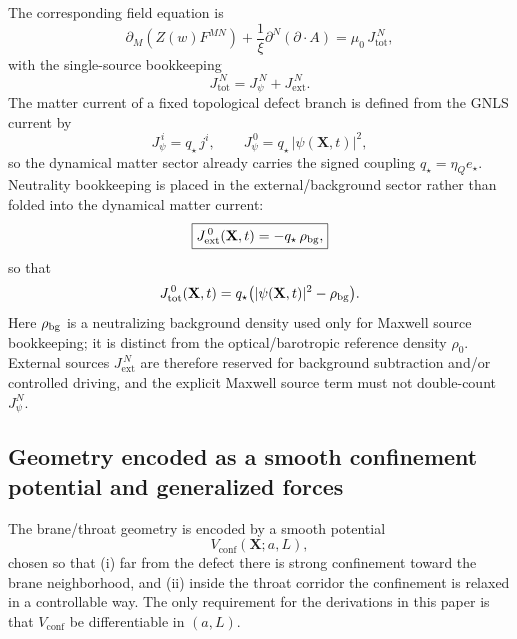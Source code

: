 \documentclass[11pt]{article}
\newcommand{\etaQ}{\eta_Q}
\newcommand{\estar}{e_\star}
\newcommand{\qstar}{q_\star}
\begin{document}
The corresponding field equation is
\begin{equation}
\boxed{
\partial_M\!\left(Z(w)F^{MN}\right)+\frac{1}{\xi}\partial^N(\partial\cdot A)
=
\mu_0\,J_{\mathrm{tot}}^{\,N},
}
\label{eq:recap_maxwell_localized}
\end{equation}
with the single-source bookkeeping
\begin{equation}
J_{\mathrm{tot}}^{\,N}=J_{\psi}^{\,N}+J_{\mathrm{ext}}^{\,N}.
\end{equation}
The matter current of a fixed topological defect branch is defined from the GNLS current by
\begin{equation}
J_{\psi}^{\,i} = \qstar\,j^i,
\qquad
J_{\psi}^{\,0} = \qstar\,|\psi(\mathbf{X},t)|^2,
\end{equation}
so the dynamical matter sector already carries the signed coupling \(\qstar=\etaQ\estar\). Neutrality bookkeeping is placed in the external/background sector rather than folded into the dynamical matter current:
\begin{equation}
\boxed{
J_{\mathrm{ext}}^{\,0}(\mathbf{X},t)
=
-\qstar\,\rho_{\rm bg},
}
\label{eq:recap_jellium}
\end{equation}
so that
\begin{equation}
J_{\mathrm{tot}}^{\,0}(\mathbf{X},t)=\qstar\big(|\psi(\mathbf{X},t)|^2-\rho_{\rm bg}\big).
\end{equation}
Here \(\rho_{\rm bg}\) is a neutralizing background density used only for Maxwell source bookkeeping; it is distinct from the optical/barotropic reference density \(\rho_0\). External sources $J_{\mathrm{ext}}^{\,N}$ are therefore reserved for background subtraction and/or controlled driving, and the explicit Maxwell source term must not double-count $J_\psi^N$.

\subsection{Geometry encoded as a smooth confinement potential and generalized forces}
\label{sec:recap_geometry}

The brane/throat geometry is encoded by a smooth potential
\begin{equation}
V_{\mathrm{conf}}(\mathbf{X};a,L),
\end{equation}
chosen so that (i) far from the defect there is strong confinement toward the brane neighborhood, and
(ii) inside the throat corridor the confinement is relaxed in a controllable way.
The only requirement for the derivations in this paper is that $V_{\mathrm{conf}}$ be differentiable in $(a,L)$.
\end{document}
